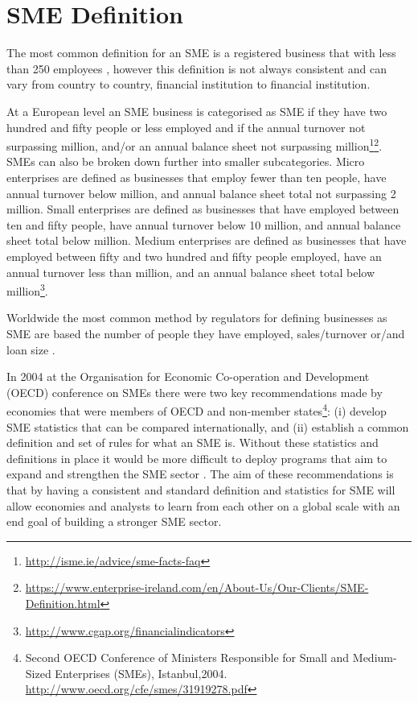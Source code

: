 \section{SME Definition}
The most common definition for an SME is a registered business that with less than 250 employees \citep{ifc_sme_2009}, however this definition is not always consistent and can vary from country to country, financial institution to financial institution. 

At a European level an SME business is categorised as SME if they have two hundred and fifty people or less employed and if the annual turnover not surpassing  million, and/or an annual balance sheet not surpassing  million\footnote{\url{http://isme.ie/advice/sme-facts-faq}}\footnote{\url{https://www.enterprise-ireland.com/en/About-Us/Our-Clients/SME-Definition.html}}. SMEs can also be broken down further into smaller subcategories. Micro enterprises are defined as businesses that employ fewer than ten people, have annual turnover below  million, and annual balance sheet total not surpassing 2 million. Small enterprises are defined as businesses that have employed between ten and fifty people, have annual turnover below 10 million, and annual balance sheet total below  million. Medium enterprises are defined as businesses that have employed between fifty and two hundred and fifty people employed, have an annual turnover less than  million, and an annual balance sheet total below  million\footnote{\url{http://www.cgap.org/financialindicators}}.

Worldwide the most common method by regulators for defining businesses as SME are based the number of people they have employed, sales/turnover or/and loan size \citep{ardic_small_2011}.

In 2004 at the Organisation for Economic Co-operation and Development (OECD) conference on SMEs there were two key recommendations made by economies that were members of OECD and non-member states\footnote{Second OECD Conference of Ministers Responsible for Small and Medium-Sized Enterprises (SMEs), Istanbul,2004. \url{http://www.oecd.org/cfe/smes/31919278.pdf}}: (i) develop SME statistics that can be compared internationally, and (ii) establish a common definition and set of rules for what an SME is. Without these statistics and definitions in place it would be more difficult to deploy programs that aim to expand and strengthen the SME sector \citep{ardic_small_2011}. The aim of these recommendations is that by having a consistent and standard definition and statistics for SME will allow economies and analysts to learn from each other on a global scale with an end goal of building a stronger SME sector.


